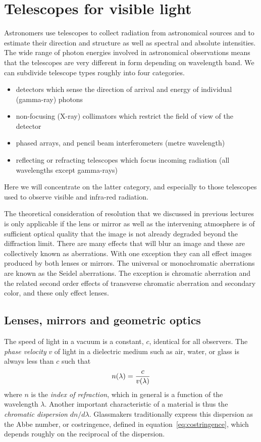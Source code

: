 \documentclass{article}
\begin{document}
\setcounter{section}{5}
\section{Telescopes for visible light}

Astronomers use telescopes to collect radiation from astronomical sources and
to estimate their direction and structure as well as spectral and absolute 
intensities. The wide range of photon energies involved in astronomical 
observations means that the telescopes are very different in form depending
on wavelength band. We can subdivide telescope types roughly into four 
categories. 
\begin{itemize}
\item detectors which sense the direction of arrival and energy of individual
(gamma-ray) photons
\item non-focusing (X-ray) collimators which restrict the field of view of 
the detector
\item phased arrays, and pencil beam interferometers (metre wavelength)
\item reflecting or refracting telescopes which focus incoming radiation 
(all wavelengths except gamma-rays)
\end{itemize}
Here we will concentrate on the latter category, and especially to those 
telescopes used to observe visible and infra-red radiation. 
 
The theoretical
consideration of resolution that we discussed in previous lectures is only 
applicable if the lens or mirror as well as the intervening atmosphere
 is of sufficient optical quality that the image is not already degraded 
beyond the diffraction limit. There are many effects that will blur an image
and these are collectively known as aberrations. With one exception they 
can all effect images produced by both lenses or mirrors. The universal
or monochromatic aberrations are known as the Seidel aberrations. The 
exception is chromatic aberration and the related second order effects of 
transverse chromatic aberration and secondary color, and these only effect
lenses.

\subsection{Lenses, mirrors and geometric optics}

The speed of light in a vacuum is a constant, $c$, identical for all observers. 
The {\it phase velocity} $v$ of light in a dielectric medium such as air, water, or glass
is always less than $c$ such that
\[
n(\lambda)={c\over v(\lambda)}
\]
where $n$ is the {\it index of refraction}, which in general is a function of the 
wavelength $\lambda$. Another important characteristic of a material is thus the 
{\it chromatic dispersion} $dn/d\lambda$. Glassmakers traditionally express this
dispersion as the Abbe number, or costringence, defined in equation~\ref{eq:costringence}, 
which depends roughly on the reciprocal of the dispersion.
\end{document}

